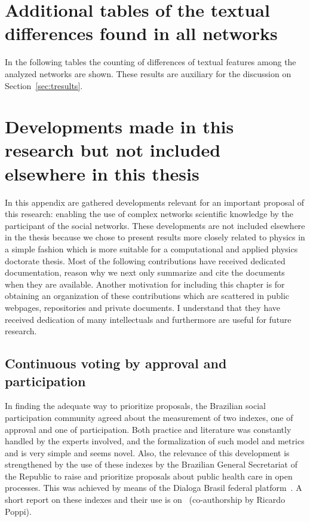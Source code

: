
\begin{apendicesenv}
	\partapendices
	\chapter{Additional tables of the textual differences found in all networks}\label{ap:textd}
In the following tables the counting of differences of textual features among the analyzed networks
are shown.
	These results are auxiliary for the discussion on Section~\ref{sec:tresults}.
\FloatBarrier











	\chapter{Developments made in this research but not included elsewhere in this thesis}\label{ap:more}
In this appendix are gathered developments relevant for an important proposal of this research:
enabling the use of complex networks scientific knowledge by the participant of the social networks.
These developments are not included elsewhere in the thesis because we chose to present results
more closely related to physics in a simple fashion which is more suitable for a computational and applied physics doctorate thesis.
Most of the following contributions have received dedicated documentation,
reason why we next only summarize and cite the documents when they are available.
Another motivation for including this chapter is for obtaining an organization of these contributions
which are scattered in public webpages, repositories and private documents.
I understand that they have received dedication of many intellectuals
and furthermore are useful for future research.

\section{Continuous voting by approval and participation}\label{ap:vot}
In finding the adequate way to prioritize proposals, the Brazilian social participation community agreed about the measurement of two indexes,
one of approval and one of participation. Both practice and literature
was constantly handled by the experts involved, and the formalization
of such model and metrics and is very simple and seems novel.
Also, the relevance of this development is strengthened by the use of these indexes by the
Brazilian General Secretariat of the Republic to raise and prioritize
proposals about public health care in open processes.
This was achieved by means of the Dialoga Brasil federal platform~\cite{dialoga}.
A short report on these indexes and their use is on~\cite{dialogaAlg}
	(co-authorship by Ricardo Poppi).


\end{apendicesenv}
